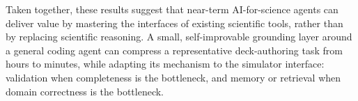 \documentclass{article}
\begin{document}
Taken together, these results suggest that near-term AI-for-science agents can deliver value by mastering the interfaces of existing scientific tools, rather than by replacing scientific reasoning. A small, self-improvable grounding layer around a general coding agent can compress a representative deck-authoring task from hours to minutes, while adapting its mechanism to the simulator interface: validation when completeness is the bottleneck, and memory or retrieval when domain correctness is the bottleneck.

\end{document}
